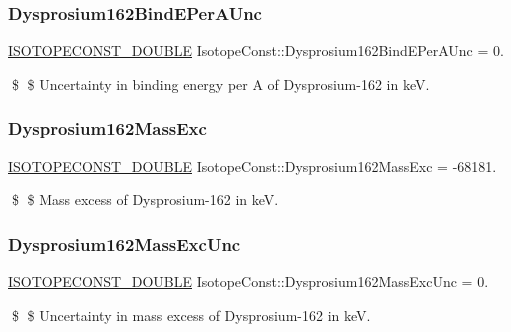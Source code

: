 \subsubsection{\texorpdfstring{Dysprosium162\+Bind\+E\+Per\+A\+Unc}{Dysprosium162BindEPerAUnc}}
{\footnotesize\ttfamily \mbox{\hyperlink{group___isotope_const-_macros_ga8f45a7272ce02c0b4c65c44636ed719a}{I\+S\+O\+T\+O\+P\+E\+C\+O\+N\+S\+T\+\_\+\+D\+O\+U\+B\+LE}} Isotope\+Const\+::\+Dysprosium162\+Bind\+E\+Per\+A\+Unc = 0.}

\$ \$ Uncertainty in binding energy per A of Dysprosium-\/162 in keV. \mbox{\label{group___isotope_const-_dysprosium-_dy162_ga7773fd834aa1e6f548bb2cb2919ce1fb}} 
\subsubsection{\texorpdfstring{Dysprosium162\+Mass\+Exc}{Dysprosium162MassExc}}
{\footnotesize\ttfamily \mbox{\hyperlink{group___isotope_const-_macros_ga8f45a7272ce02c0b4c65c44636ed719a}{I\+S\+O\+T\+O\+P\+E\+C\+O\+N\+S\+T\+\_\+\+D\+O\+U\+B\+LE}} Isotope\+Const\+::\+Dysprosium162\+Mass\+Exc = -\/68181.}

\$ \$ Mass excess of Dysprosium-\/162 in keV. \mbox{\label{group___isotope_const-_dysprosium-_dy162_ga5cd6d3d1192470947bc39bd9908f042e}} 
\subsubsection{\texorpdfstring{Dysprosium162\+Mass\+Exc\+Unc}{Dysprosium162MassExcUnc}}
{\footnotesize\ttfamily \mbox{\hyperlink{group___isotope_const-_macros_ga8f45a7272ce02c0b4c65c44636ed719a}{I\+S\+O\+T\+O\+P\+E\+C\+O\+N\+S\+T\+\_\+\+D\+O\+U\+B\+LE}} Isotope\+Const\+::\+Dysprosium162\+Mass\+Exc\+Unc = 0.}

\$ \$ Uncertainty in mass excess of Dysprosium-\/162 in keV. \mbox{\label{group___isotope_const-_dysprosium-_dy162_ga64d6d3d8c60a970cf505605e2805bd37}} 
